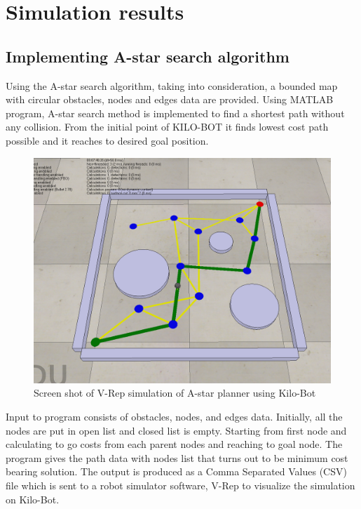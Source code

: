 \documentclass[12pt]{article}
\begin{document}
\section{Simulation results}
\subsection{Implementing A-star search algorithm}
Using the A-star search algorithm, taking into consideration, a bounded map with circular obstacles, nodes and edges data are provided. Using MATLAB program, A-star search method is implemented to find a shortest path without any collision. From the initial point of KILO-BOT it finds lowest cost path possible and it reaches to desired goal position.\;
\begin{figure}[H]
\centering
\includegraphics[scale=0.4]{VREP_Screenshot.png}
\captionsetup{labelformat=empty}
\caption{Screen shot of V-Rep simulation of A-star planner using Kilo-Bot}
\end{figure}
Input to program consists of obstacles, nodes, and edges data. Initially, all the nodes are put in open list and closed list is empty. Starting from first node and calculating to go costs from each parent nodes and reaching to goal node. The program gives the path data with nodes list that turns out to be minimum cost bearing solution. The output is produced as a Comma Separated Values (CSV) file which is sent to a robot simulator software, V-Rep to visualize the simulation on Kilo-Bot.    
\end{document}
